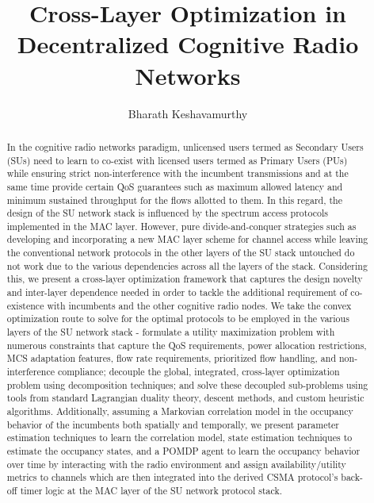 \documentclass[12pt, draftcls, onecolumn]{IEEEtran}
\begin{document}
 
\title{Cross-Layer Optimization in Decentralized Cognitive Radio Networks}
\author{Bharath Keshavamurthy}
\maketitle
{}
\begin{abstract}
In the cognitive radio networks paradigm, unlicensed users termed as Secondary Users (SUs) need to learn to co-exist with licensed users termed as Primary Users (PUs) while ensuring strict non-interference with the incumbent transmissions and at the same time provide certain QoS guarantees such as maximum allowed latency and minimum sustained throughput for the flows allotted to them. In this regard, the design of the SU network stack is influenced by the spectrum access protocols implemented in the MAC layer. However, pure divide-and-conquer strategies such as developing and incorporating a new MAC layer scheme for channel access while leaving the conventional network protocols in the other layers of the SU stack untouched do not work due to the various dependencies across all the layers of the stack. Considering this, we present a cross-layer optimization framework that captures the design novelty and inter-layer dependence needed in order to tackle the additional requirement of co-existence with incumbents and the other cognitive radio nodes. We take the convex optimization route to solve for the optimal protocols to be employed in the various layers of the SU network stack - formulate a utility maximization problem with numerous constraints that capture the QoS requirements, power allocation restrictions, MCS adaptation features, flow rate requirements, prioritized flow handling, and non-interference compliance; decouple the global, integrated, cross-layer optimization problem using decomposition techniques; and solve these decoupled sub-problems using tools from standard Lagrangian duality theory, descent methods, and custom heuristic algorithms. Additionally, assuming a Markovian correlation model in the occupancy behavior of the incumbents both spatially and temporally, we present parameter estimation techniques to learn the correlation model, state estimation techniques to estimate the occupancy states, and a POMDP agent to learn the occupancy behavior over time by interacting with the radio environment and assign availability/utility metrics to channels which are then integrated into the derived CSMA protocol's back-off timer logic at the MAC layer of the SU network protocol stack.
\end{abstract}
\newpage
\end{document}
